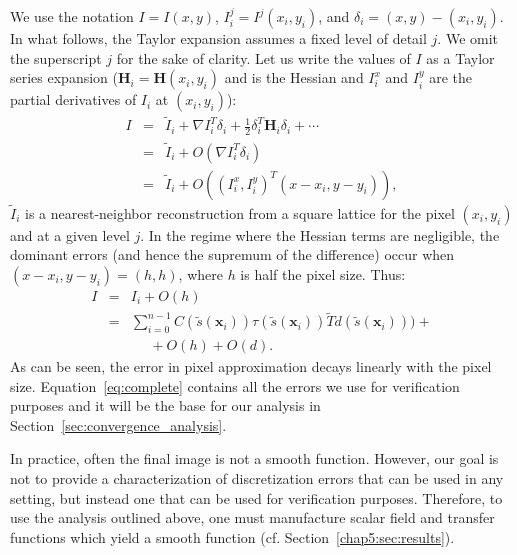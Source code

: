 We use the notation $I = I(x,y)$, $I^j_i = I^j(x_i, y_i)$, and $\delta_i =
(x, y) - (x_i, y_i)$. In what follows, the Taylor expansion assumes a fixed level of detail $j$. 
We omit the superscript $j$ for the sake of clarity. Let us write
 the values of $I$ as a Taylor series expansion ($\mathbf{H}_i = 
 \mathbf{H}(x_i, y_i)$ and is the Hessian and $I_i^x$ and $I_i^y$ 
 are the partial derivatives of $I_i$ at $(x_i, y_i)$):
\begin{eqnarray}
I &=& \tilde{I}_i + \nabla I_i^T \delta_i + \frac{1}{2}\delta_i^T \mathbf{H}_i
\delta_i + \cdots \\
  &=& \tilde{I}_i + O(\nabla I_i^T \delta_i)\\
  &=& \tilde{I}_i + O( (I_i^x, I_i^y)^T (x - x_i, y - y_i)),
\end{eqnarray}
$\tilde{I}_i$ is a nearest-neighbor reconstruction from a square
lattice for the pixel $(x_i, y_i)$ and at a given level $j$. In the regime where the Hessian terms are negligible, the
dominant errors (and hence the supremum of the difference) occur 
when $(x - x_i, y - y_i) = (h, h)$, where $h$ is half the pixel size.
Thus: 
\begin{eqnarray}
I &=& I_i + O(h)\\
&=& \sum_{i = 0} ^ {n - 1} C (\tilde{s}(\mathbf{x}_i))\tau(
\tilde{s}( \mathbf{x}_i)) \tilde{T}d(\tilde{s}(\mathbf{x}_i))) +\nonumber\\
&& ~~~~~~ + O(h) + O(d). \label{eq:complete}
\end{eqnarray}
As can be seen, the error in pixel approximation decays linearly with the pixel
size. Equation~\eqref{eq:complete} contains all the errors we use for
verification purposes and it will be the base for our analysis in
Section~\ref{sec:convergence_analysis}.

In practice, often the final image is not
a smooth function. However, our goal is not to provide a
characterization of discretization errors that can be used in any
setting, but instead one that can be used for
verification purposes. Therefore, 
to use the analysis outlined above,
one must manufacture scalar field and transfer functions which yield a smooth function (cf. Section~\ref{chap5:sec:results}).


